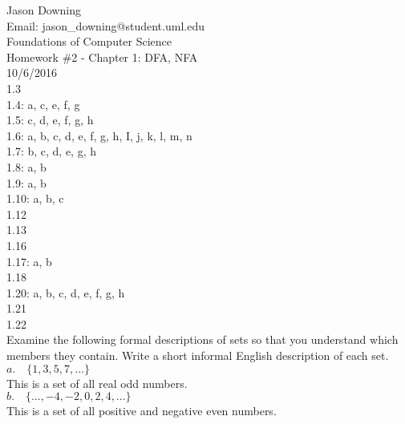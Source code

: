 \documentclass[12pt]{article}
\begin{document}
\noindent
Jason Downing \\
Email: jason\_downing@student.uml.edu \\
Foundations of Computer Science \\
Homework \#2 - Chapter 1: DFA, NFA\\
10/6/2016 \\

1.3 \\

1.4: a, c, e, f, g \\

1.5: c, d, e, f, g, h \\

1.6: a, b, c, d, e, f, g, h, I, j, k, l, m, n \\

1.7: b, c, d, e, g, h \\

1.8: a, b \\

1.9: a, b \\

1.10: a, b, c \\

1.12 \\

1.13 \\

1.16 \\

1.17: a, b \\

1.18 \\

1.20: a, b, c, d, e, f, g, h \\

1.21 \\

1.22 \\

 \quad Examine the following formal descriptions of sets so that you understand which
members they contain. Write a short informal English description of each set.
\\
\indent
$a. \quad \{1, 3, 5, 7, ...\} $ \\
\indent
This is a set of all real odd numbers. \\

$b. \quad \{...,-4,-2,0,2,4,...\} $ \\
\indent
This is a set of all positive and negative even numbers. \\
\end{document}
